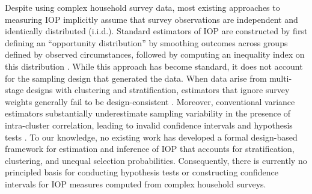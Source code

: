 \documentclass[12pt]{article}
\theoremstyle{plain}
\theoremstyle{definition}
\begin{document}
Despite using complex household survey data, most existing approaches to measuring IOP implicitly assume that survey observations are independent and identically distributed (i.i.d.). Standard estimators of IOP are constructed by first defining an ``opportunity distribution'' by smoothing outcomes across groups defined by observed circumstances, followed by computing an inequality index on this distribution \citep[e.g.,][]{ferreira2011measurement, lefranc2009equality}. While this approach has become standard, it does not account for the sampling design that generated the data. When data arise from multi-stage designs with clustering and stratification, estimators that ignore survey weights generally fail to be design-consistent \citep[e.g.,][]{Binder1995estimating}. Moreover, conventional variance estimators substantially underestimate sampling variability in the presence of intra-cluster correlation, leading to invalid confidence intervals and hypothesis tests \citep[e.g.,][]{skinner1989analysis, lee2005analyzing}. To our knowledge, no
existing work has developed a formal design-based framework for estimation and inference of IOP that accounts for stratification, clustering, and unequal selection probabilities. Consequently, there is currently no principled basis for conducting hypothesis tests or constructing confidence intervals for IOP measures computed from complex household surveys.
\end{document}
